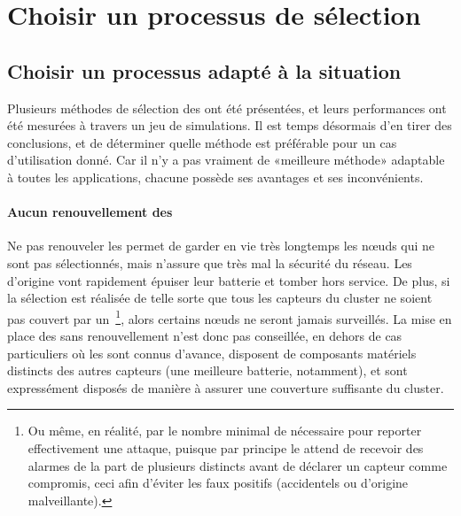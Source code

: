 \section{Choisir un processus de sélection}

    \subsection{Choisir un processus adapté à la situation}
Plusieurs méthodes de sélection des \cns ont été présentées, et leurs performances ont été mesurées à travers un jeu de simulations.
Il est temps désormais d'en tirer des conclusions, et de déterminer quelle méthode est préférable pour un cas d'utilisation donné.
Car il n'y a pas vraiment de «meilleure méthode» adaptable à toutes les applications, chacune possède ses avantages et ses inconvénients.

\paragraph{Aucun renouvellement des \cns}
Ne pas renouveler les \cns permet de garder en vie très longtemps les nœuds qui ne sont pas sélectionnés, mais n'assure que très mal la sécurité du réseau.
Les \cns d'origine vont rapidement épuiser leur batterie et tomber hors service.
De plus, si la sélection est réalisée de telle sorte que tous les capteurs du cluster ne soient pas couvert par un \cn\,\footnote{Ou même, en réalité, par le nombre minimal de \cns nécessaire pour reporter effectivement une attaque, puisque par principe le \ch attend de recevoir des alarmes de la part de plusieurs \cns distincts avant de déclarer un capteur comme compromis, ceci afin d'éviter les faux positifs (accidentels ou d'origine malveillante).}, alors certains nœuds ne seront jamais surveillés.
La mise en place des \cns sans renouvellement n'est donc pas conseillée, en dehors de cas particuliers où les \cns sont connus d'avance, disposent de composants matériels distincts des autres capteurs (une meilleure batterie, notamment), et sont expressément disposés de manière à assurer une couverture suffisante du cluster.


